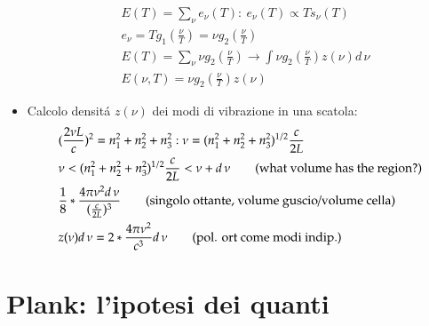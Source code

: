 \begin{itemize}
                            \begin{align*}
                                &E(T)=\sum_{\nu}e_{\nu}(T):\ e_{\nu}(T)\propto Ts_{\nu}(T)\\
                                &e_{\nu}=Tg_1(\frac{\nu}{T})=\nu g_2(\frac{\nu}{T})\\
                                &E(T)=\sum_{\nu}\nu g_2(\frac{\nu}{T})\to\int\nu g_2(\frac{\nu}{T})z(\nu)d\,\nu\\
                                &E(\nu,T)=\nu g_2(\frac{\nu}{T})z(\nu)\tag{densit\'a di energia}
                            \end{align*}
                        \item Calcolo densit\'a $z(\nu)$ dei modi di vibrazione in una scatola:
                            \begin{align*}
                                &(\frac{2\nu L}{c})^2=n_1^2+n_2^2+n_3^2: \nu=(n_1^2+n_2^2+n_3^2)^{1/2}\frac{c}{2L}\\
                                &\nu<(n_1^2+n_2^2+n_3^2)^{1/2}\frac{c}{2L}<\nu+d\,\nu\tag{what volume has the region?}\\
                                &\frac{1}{8}*\frac{4\pi\nu^2d\,\nu}{(\frac{c}{2L})^3}\tag{singolo ottante, volume guscio/volume cella}\\
                                &z(\nu)d\,\nu=2*\frac{4\pi\nu^2}{c^3}d\,\nu\tag{pol. ort come modi indip.}
                            \end{align*}
                    \end{itemize}
        \section{Plank: l'ipotesi dei quanti}
